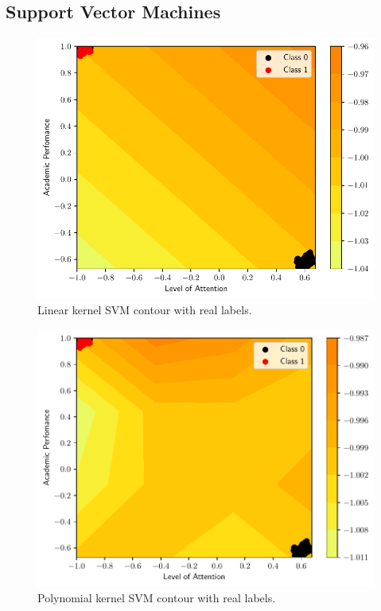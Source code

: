 \documentclass[conference]{IEEEtran}
\theoremstyle{definition}
\theoremstyle{remark}
\theoremstyle{remark}
\begin{document}
\subsection{Support Vector Machines}
\begin{figure}
  \includegraphics[width=\columnwidth]{figs/svm-emb-linear-contour-0-1.pdf}
  \caption{Linear kernel SVM contour with real labels.}
\end{figure}

\begin{figure}
  \includegraphics[width=\columnwidth]{figs/svm-emb-poly-contour-0-1.pdf}
  \caption{Polynomial kernel SVM contour with real labels.}
\end{figure}
\end{document}
